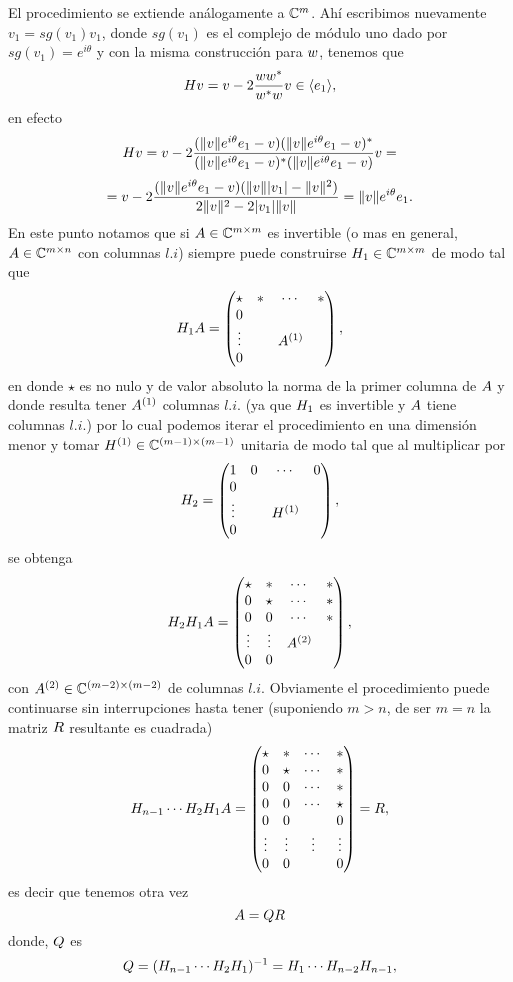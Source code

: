 \begin{tcolorbox}
El procedimiento se extiende análogamente  a $\mathbb C^{m}$. Ahí escribimos nuevamente $v_1=sg(v_1)v_1$, donde $sg(v_1)$ es el complejo de módulo uno dado por $sg(v_1)=e^{i\theta}$ y
con la misma construcción para $\wb$, tenemos que
$$
\Hbb\vb=\vb-2\frac{\wb\wb^*}{\wb^*\wb}\vb \in \langle \eb_1 \rangle,
$$
en efecto
$$\Hbb\vb=\vb - 2\frac{(\|\vb\|e^{i\theta}\eb_1-\vb)(\|\vb\|e^{i\theta}\eb_1-\vb)^*}{(\|\vb\|e^{i\theta}\eb_1-\vb)^*(\|\vb\|e^{i\theta}\eb_1-\vb)}\vb=
$$
$$
 =\vb-2\frac{(\|\vb\|e^{i\theta}\eb_1-\vb)(\|\vb\||v_1|-\|\vb\|^2)}{2\|\vb\|^2-2|v_1|\|\vb\|}=\|\vb\|e^{i\theta}\eb_1.
$$
En este punto notamos que si
$\Ab\in \Cmm$ es invertible (o mas en general, $\Ab\in \Cmn$ con columnas $l.i$) siempre puede construirse $\Hb_1\in \Cmm$  de modo tal que
$$
\Hb_1\Ab=
\begin{pmatrix}
 \star&*&\cdots &*\\
 0&&&\\
  \vdots&&\Ab^{(1)}&\\
 0&&&\\
\end{pmatrix},
$$
en  donde $\star$ es no nulo y de valor absoluto la norma de la primer columna de $\Ab$ y donde resulta tener $\Ab^{(1)}$ columnas $l.i.$ (ya que $\Hbb_1$ es invertible y $\Ab$ tiene columnas $l.i.$) por lo cual podemos iterar el procedimiento en una dimensión menor y tomar
$\Hbb^{(1)}\in \C^{(m-1)\times (m-1)}$ unitaria de modo tal que al multiplicar por
$$
\Hbb_2=\begin{pmatrix}
 1&0&\cdots &0\\
 0&&&\\
  \vdots&&\Hbb^{(1)}&\\
 0&&&\\
\end{pmatrix},
$$
 se obtenga
$$
\Hbb_2\Hbb_1\Ab=
\begin{pmatrix}
 \star&*&\cdots &*\\
 0&\star&\cdots&*\\
 0&0&\cdots&*\\
  \vdots&\vdots&\Ab^{(2)}&\\
 0&0&&\\
\end{pmatrix},
$$
con
$\Ab^{(2)}\in \C^{(m-2)\times (m-2)}$ de columnas $l.i$.
Obviamente el procedimiento puede continuarse sin interrupciones hasta tener (suponiendo $m>n$, de ser $m=n$  la matriz $\Rb$ resultante es cuadrada)
$$
\Hbb_{n-1}\cdots \Hbb_2\Hbb_1\Ab=
\begin{pmatrix}
 \star&*&\cdots &*\\
 0&\star&\cdots&*\\
 0&0&\cdots&*\\
 0&0&\cdots&\star\\
 0&0&&0\\
  \vdots&\vdots&\vdots&\vdots\\
 0&0&&0
\end{pmatrix}=\Rb,
$$
es decir que tenemos otra vez
$$
\Ab=\Qb\Rb
$$
donde, $\Qb$ es
\begin{equation}
 \label{ec:Q}
\Qb=(\Hbb_{n-1}\cdots \Hbb_2\Hbb_1)^{-1}=\Hbb_{1}\cdots \Hbb_{n-2}\Hbb_{n-1},
\end{equation}


\end{tcolorbox}
